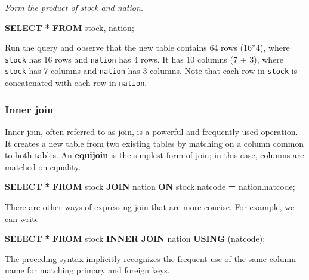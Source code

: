 \documentclass[
]{article}
\newenvironment{Shaded}{\begin{snugshade}}{\end{snugshade}}
\newcommand{\KeywordTok}[1]{\textcolor[rgb]{0.13,0.29,0.53}{\textbf{#1}}}
\newcommand{\NormalTok}[1]{#1}
\newcommand{\OperatorTok}[1]{\textcolor[rgb]{0.81,0.36,0.00}{\textbf{#1}}}
\begin{document}
\emph{Form the product of stock and nation.}

\begin{Shaded}
\begin{Highlighting}[]
\KeywordTok{SELECT} \OperatorTok{*} \KeywordTok{FROM}\NormalTok{ stock, nation;}
\end{Highlighting}
\end{Shaded}

Run the query and observe that the new table contains 64 rows (16*4),
where \texttt{stock} has 16 rows and \texttt{nation} has 4 rows. It has
10 columns (7 + 3), where \texttt{stock} has 7 columns and
\texttt{nation} has 3 columns. Note that each row in \texttt{stock} is
concatenated with each row in \texttt{nation}.

\hypertarget{inner-join}{%
\subsubsection*{Inner join}\label{inner-join}}

Inner join, often referred to as join, is a powerful and frequently used
operation. It creates a new table from two existing tables by matching
on a column common to both tables. An \textbf{equijoin} is the simplest
form of join; in this case, columns are matched on equality.

\begin{Shaded}
\begin{Highlighting}[]
\KeywordTok{SELECT} \OperatorTok{*} \KeywordTok{FROM}\NormalTok{ stock }\KeywordTok{JOIN}\NormalTok{ nation}
    \KeywordTok{ON}\NormalTok{ stock.natcode }\OperatorTok{=}\NormalTok{ nation.natcode;}
\end{Highlighting}
\end{Shaded}

There are other ways of expressing join that are more concise. For
example, we can write

\begin{Shaded}
\begin{Highlighting}[]
\KeywordTok{SELECT} \OperatorTok{*} \KeywordTok{FROM}\NormalTok{ stock }\KeywordTok{INNER} \KeywordTok{JOIN}\NormalTok{ nation }\KeywordTok{USING}\NormalTok{ (natcode);}
\end{Highlighting}
\end{Shaded}

The preceding syntax implicitly recognizes the frequent use of the same
column name for matching primary and foreign keys.
\end{document}
